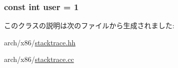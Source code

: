 \label{classX86ISA_1_1StackTrace_a204dd651615bf73491349b6403571f10}
\hypertarget{classX86ISA_1_1StackTrace_a80f5e5d52e325fee3fb197c8a15ff3b9}{
\subsubsection[{user}]{\setlength{\rightskip}{0pt plus 5cm}const int {\bf user} = 1}}
\label{classX86ISA_1_1StackTrace_a80f5e5d52e325fee3fb197c8a15ff3b9}


このクラスの説明は次のファイルから生成されました:\begin{DoxyCompactItemize}
\item 
arch/x86/\hyperlink{x86_2stacktrace_8hh}{stacktrace.hh}\item 
arch/x86/\hyperlink{x86_2stacktrace_8cc}{stacktrace.cc}\end{DoxyCompactItemize}

